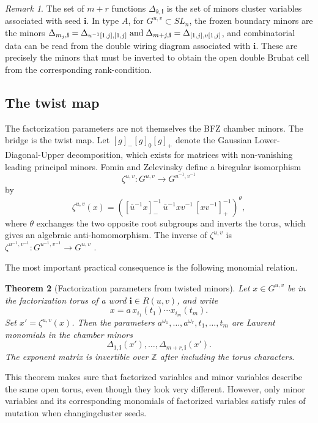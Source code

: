 \documentclass[12pt]{amsart}
\newcommand{\Z}{\mathbb Z}
\newcommand{\bi}{\mathbf i}
\theoremstyle{plain}
\newtheorem{theorem}{Theorem}[section]
\theoremstyle{definition}
\theoremstyle{remark}
\newtheorem{remark}[theorem]{Remark}
\begin{document}
\begin{remark}
The set of $m+r$ functions $\Delta_{k,\bi}$ is the set of minors cluster variables associated with seed $\bi$.  In type $A$, for $G^{u,v}\subset SL_n$, the frozen boundary minors are the minors $\Delta_{m_j,\bi}=\Delta_{u^{-1}[1,j],[1,j]}\; \textup{and} \; \Delta_{m+j,\bi}=\Delta_{[1,j],v[1,j]}$, and combinatorial data can be read from the double wiring diagram associated with $\bi$. These are precisely the minors that must be inverted to obtain the open double Bruhat cell from the corresponding rank-condition.
\end{remark}

\subsection{The twist map}

The factorization parameters are not themselves the BFZ chamber minors.  The bridge is the twist map.  Let $[g]_- [g]_0 [g]_+$ denote the Gaussian Lower-Diagonal-Upper decomposition, which exists for matrices with non-vanishing leading principal minors.  Fomin and Zelevinsky define a biregular isomorphism
\[
   \zeta^{u,v}:G^{u,v}\longrightarrow G^{u^{-1},v^{-1}}
\]
by
\[
   \zeta^{u,v}(x)=
   \left([\bar u^{-1}x]_-^{-1}\,\bar u^{-1}xv^{-1}\,[xv^{-1}]_+^{-1}\right)^\theta,
\]
where $\theta$ exchanges the two opposite root subgroups and inverts the torus, which gives an algebraic anti-homomorphism.  The inverse of $\zeta^{u,v}$ is $\zeta^{u^{-1},v^{-1}}: G^{u^{-1},v^{-1}}\longrightarrow G^{u,v}$ \cite{FZ99}.

The most important practical consequence is the following monomial relation.

\begin{theorem}[Factorization parameters from twisted minors]\label{thm:twist_monomial}
Let $x\in G^{u,v}$ be in the factorization torus of a word $\bi\in R(u,v)$, and write
\[
   x=a\,x_{i_1}(t_1)\cdots x_{i_m}(t_m).
\]
Set $x'=\zeta^{u,v}(x)$.  Then the parameters $a^{\omega_1},\ldots,a^{\omega_r},t_1,\ldots,t_m$ are Laurent monomials in the chamber minors
\[
   \Delta_{1,\bi}(x'),\ldots,\Delta_{m+r,\bi}(x').
\]
The exponent matrix is invertible over $\Z$ after including the torus characters.
\end{theorem}

This theorem makes sure that factorized variables and minor variables describe the same open torus, even though they look very different. However, only minor variables and its corresponding monomials of factorized variables satisfy rules of mutation when changingcluster seeds.
\end{document}
